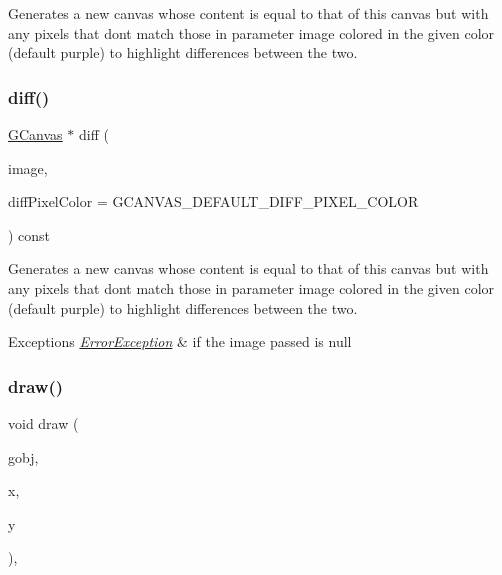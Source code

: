Generates a new canvas whose content is equal to that of this canvas but with any pixels that don\textquotesingle{}t match those in parameter \textquotesingle{}image\textquotesingle{} colored in the given color (default purple) to highlight differences between the two. 

\mbox{\label{classGCanvas_a5385d5c8fda55dfe0b20851d293b338b}} 
\subsubsection{\texorpdfstring{diff()}{diff()}\hspace{0.1cm}{\footnotesize\ttfamily [2/2]}}
{\footnotesize\ttfamily \mbox{\hyperlink{classGCanvas}{G\+Canvas}} $\ast$ diff (\begin{DoxyParamCaption}\item[{const \mbox{\hyperlink{classGCanvas}{G\+Canvas}} $\ast$}]{image,  }\item[{int}]{diff\+Pixel\+Color = {\ttfamily GCANVAS\+\_\+DEFAULT\+\_\+DIFF\+\_\+PIXEL\+\_\+COLOR} }\end{DoxyParamCaption}) const\hspace{0.3cm}{\ttfamily [virtual]}}



Generates a new canvas whose content is equal to that of this canvas but with any pixels that don\textquotesingle{}t match those in parameter \textquotesingle{}image\textquotesingle{} colored in the given color (default purple) to highlight differences between the two. 


\begin{DoxyExceptions}{Exceptions}
{\em \mbox{\hyperlink{classErrorException}{Error\+Exception}}} & if the image passed is null \\
\hline
\end{DoxyExceptions}
\mbox{\label{classGDrawingSurface_acc3825d7a24815d1e2f78e7c3ffea6cc}} 
\subsubsection{\texorpdfstring{draw()}{draw()}\hspace{0.1cm}{\footnotesize\ttfamily [1/4]}}
{\footnotesize\ttfamily void draw (\begin{DoxyParamCaption}\item[{\mbox{\hyperlink{classGObject}{G\+Object}} $\ast$}]{gobj,  }\item[{double}]{x,  }\item[{double}]{y }\end{DoxyParamCaption})\hspace{0.3cm}{\ttfamily [virtual]}, {\ttfamily [inherited]}}



